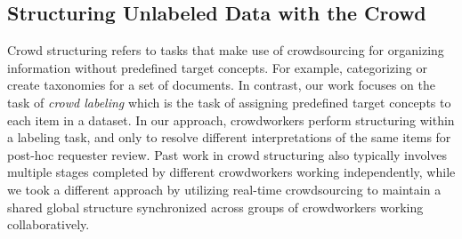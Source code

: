 
\subsection{Structuring Unlabeled Data with the Crowd}
Crowd structuring refers to tasks that make use of crowdsourcing for organizing information without predefined target concepts. For example, categorizing \cite{alloy,crowdsynth} or create taxonomies \cite{cascade} for a set of documents. In contrast, our work focuses on the task of \emph{crowd labeling} which is the task of assigning predefined target concepts to each item in a dataset. In our approach, crowdworkers perform structuring within a labeling task, and only to resolve different interpretations of the same items for post-hoc requester review. Past work in crowd structuring also typically involves multiple stages completed by different crowdworkers working independently, while we took a different approach by utilizing real-time crowdsourcing to maintain a shared global structure synchronized across groups of crowdworkers working collaboratively. 



